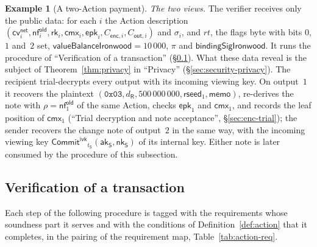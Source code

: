 \documentclass[11pt,a4paper]{article}
\theoremstyle{definition}
\newtheorem{example}[theorem]{Example}
\newcommand{\nfsym}{\mathsf{nf}}
\newcommand{\cmx}{\mathsf{cmx}}
\newcommand{\cvsym}{\mathsf{cv}}
\newcommand{\rk}{\mathsf{rk}}
\newcommand{\CommitIvk}{\ensuremath{\mathsf{Commit}^{\mathsf{ivk}}}}
\newcommand{\aksym}{\ensuremath{\mathsf{ak}}}
\newcommand{\nksym}{\ensuremath{\mathsf{nk}}}
\begin{document}
\begin{example}[A two-Action payment]
\emph{The two views.} The verifier receives only the public data: for each
$i$ the Action description $(\cvsym^{\mathsf{net}}_i,
\nfsym^{\mathsf{old}}_i, \rk_i, \cmx_i, \mathsf{epk}_i, C_{\mathsf{enc},i},
C_{\mathsf{out},i})$ and $\sigma_i$, and $\mathit{rt}$, the flags byte with
bits $0$, $1$ and~$2$ set, $\mathsf{valueBalanceIronwood} = 10\,000$, $\pi$
and $\mathsf{bindingSigIronwood}$. It runs the procedure of ``Verification
of a transaction'' (\S\ref{sec:tx-verify}). What these data reveal is the
subject of Theorem~\ref{thm:privacy} in ``Privacy''
(\S\ref{sec:security-privacy}). The recipient trial-decrypts every output
with its incoming viewing key. On output~$1$ it recovers the plaintext
$(\mathtt{0x03}, d_{\mathsf{R}}, 500\,000\,000, \mathsf{rseed}_1,
\mathsf{memo})$, re-derives the note with
$\rho = \nfsym^{\mathsf{old}}_1$ of the same Action, checks
$\mathsf{epk}_1$ and $\cmx_1$, and records the leaf position of $\cmx_1$
(``Trial decryption and note acceptance'', \S\ref{sec:enc-trial}); the
sender recovers the change note of output~$2$ in the same way, with the
incoming viewing key $\CommitIvk_{t_{\mathsf{S}}}(\aksym_{\mathsf{S}},
\nksym_{\mathsf{S}})$ of its internal key. Either note
is later consumed by the procedure of this subsection.
\end{example}

\FloatBarrier
\subsection{Verification of a transaction}\label{sec:tx-verify}

Each step of the following procedure is tagged with the requirements whose
soundness part it serves and with the conditions of
Definition~\ref{def:action} that it completes, in the pairing of the
requirement map, Table~\ref{tab:action-req}.
\end{document}
